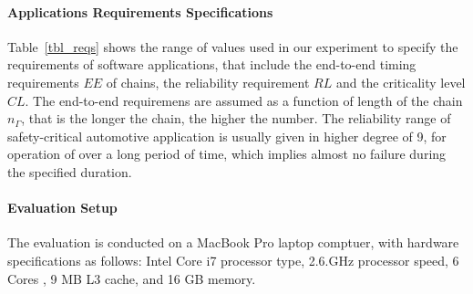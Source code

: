 
\paragraph{Applications Requirements Specifications } Table~\ref{tbl_reqs}  shows the range of values used in our experiment to specify the requirements of software applications, that include the end-to-end timing requirements $EE$ of chains, the reliability requirement $RL$ and the criticality level $CL$. The end-to-end requiremens are assumed as a function of length of the chain $n_\Gamma$, that is the longer the chain, the higher the number. The reliability range of safety-critical automotive application is usually given in higher degree of 9, for operation of over a long period of time, which implies almost no failure during the specified duration.

\paragraph{Evaluation Setup} The evaluation is conducted on a MacBook Pro laptop comptuer, with hardware specifications as follows: Intel Core i7 processor type, 2.6.GHz processor speed, 6 Cores , 9 MB L3 cache, and 16 GB memory.


